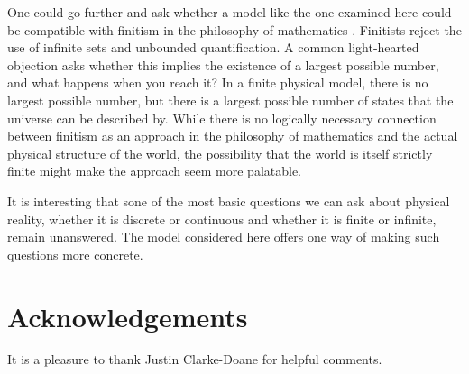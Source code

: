 \documentclass[aps,prd,nofootinbib,notitlepage,12pt]{revtex4-2}
\begin{document}
One could go further and ask whether a model like the one examined here could be compatible with finitism in the philosophy of mathematics \cite{ye2011strict}.
Finitists reject the use of infinite sets and unbounded quantification.
A common light-hearted objection asks whether this implies the existence of a largest possible number, and what happens when you reach it?
In a finite physical model, there is no largest possible number, but there is a largest possible number of states that the universe can be described by. 
While there is no logically necessary connection between finitism as an approach in the philosophy of mathematics and the actual physical structure of the world, the possibility that the world is itself strictly finite might make the approach seem more palatable.

It is interesting that sone of the most basic questions we can ask about physical reality, whether it is discrete or continuous and whether it is finite or infinite, remain unanswered.
The model considered here offers one way of making such questions more concrete.


\section*{Acknowledgements}
It is a pleasure to thank Justin Clarke-Doane for helpful comments.




\end{document}
